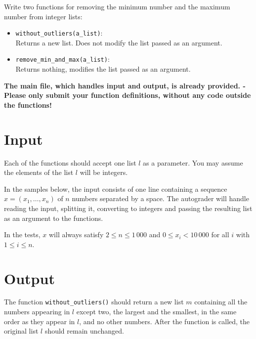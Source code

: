 

Write two functions for removing the minimum number and the maximum number from integer lists:

\begin{itemize}
    \item
    \texttt{without\_outliers(a\_list)}:\\
    Returns a new list.
    Does not modify the list passed as an argument.

    \item
    \texttt{remove\_min\_and\_max(a\_list)}:\\
    Returns nothing,
    modifies the list passed as an argument.
\end{itemize}

\textbf{The main file, which handles input and output, is already provided. -
Please only submit your function definitions, without any code outside the functions!}


\section*{Input}

Each of the functions should accept one list $l$ as a parameter.
You may assume the elements of the list $l$ will be integers.

In the samples below, the input consists of one line
containing a sequence $x = (x_1, \dots, x_n)$ of $n$ numbers
separated by a space.
The autograder will handle reading the input,
splitting it, converting to integers
and passing the resulting list as an argument to the functions.

In the tests, $x$ will always satisfy $2 \le n \le 1\,000$
and $0 \le x_i < 10\,000$ for all $i$ with $1 \le i \le n$.

\section*{Output}

The function \texttt{without\_outliers()}
should return a new list $m$
containing all the numbers appearing in $l$
except two, the largest and the smallest,
in the same order as they appear in $l$,
and no other numbers.
After the function is called,
the original list $l$ should remain unchanged.

